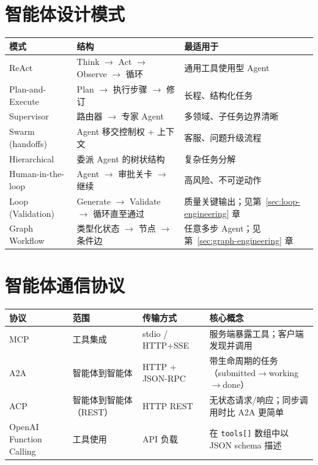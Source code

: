 \section{智能体设计模式}
\label{agentic-design-patterns}

\begin{center}
\begin{tabularx}{0.88\linewidth}{@{}l Z{1.07} Z{0.93}@{}}
\toprule
\textbf{模式} & \textbf{结构} & \textbf{最适用于} \\
\midrule
ReAct & Think $\to$ Act $\to$ Observe $\to$ 循环 & 通用工具使用型 Agent \\
Plan-and-Execute & Plan $\to$ 执行步骤 $\to$ 修订 & 长程、结构化任务 \\
Supervisor & 路由器 $\to$ 专家 Agent & 多领域、子任务边界清晰 \\
Swarm (handoffs) & Agent 移交控制权 + 上下文 & 客服、问题升级流程 \\
Hierarchical & 委派 Agent 的树状结构 & 复杂任务分解 \\
Human-in-the-loop & Agent $\to$ 审批关卡 $\to$ 继续 & 高风险、不可逆动作 \\
Loop (Validation) & Generate $\to$ Validate $\to$ 循环直至通过 & 质量关键输出；见第~\ref{sec:loop-engineering} 章 \\
Graph Workflow & 类型化状态 $\to$ 节点 $\to$ 条件边 & 任意多步 Agent；见第~\ref{sec:graph-engineering} 章 \\
\bottomrule
\end{tabularx}
\end{center}

\section{智能体通信协议}
\label{agent-communication-protocols}

\noindent\begin{tabularx}{\linewidth}{@{}l Z{0.42} Z{0.75} Z{1.83}@{}}
\toprule
\textbf{协议} & \textbf{范围} & \textbf{传输方式} & \textbf{核心概念} \\
\midrule
MCP & 工具集成 & stdio / HTTP+SSE & 服务端暴露工具；客户端发现并调用 \\
A2A & 智能体到智能体 & HTTP + JSON-RPC & 带生命周期的任务（submitted$\to$working$\to$done） \\
ACP & 智能体到智能体（REST） & HTTP REST & 无状态请求/响应；同步调用时比 A2A 更简单 \\
OpenAI Function Calling & 工具使用 & API 负载 & 在 \texttt{tools[]} 数组中以 JSON schema 描述 \\
\bottomrule
\end{tabularx}

